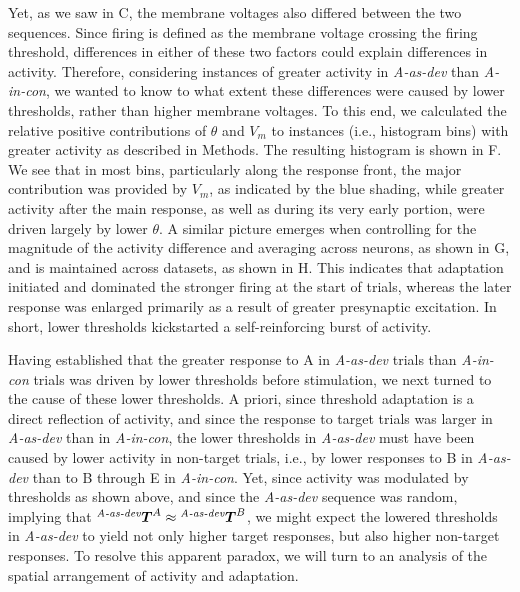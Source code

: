 \documentclass[9pt,lineno,onehalfspacing]{elife}
\newcommand{\dev}{\textit{A-as-dev}}
\newcommand{\msc}{\textit{A-in-con}}
\newcommand{\std}{\textit{A-as-std}}
\newcommand{\ifstringequal}[4]{%
  \ifnum\pdfstrcmp{#1}{#2}=0
  #3%
  \else
  #4%
  \fi
}
\newcommand{\seqreplace}[1]{\ifstringequal{dev}{#1}{\dev}{%
    \ifstringequal{std}{#1}{\std}{%
        \ifstringequal{msc}{#1}{\msc}{#1}%
    }%
}}
\newcommand{\T}[3][]{{}^{\seqreplace{#1}}_{}\boldsymbol T^{#2}_{#3}}
\begin{document}
Yet, as we saw in C, the membrane voltages also differed between the two sequences. Since firing is defined as the membrane voltage crossing the firing threshold, differences in either of these two factors could explain differences in activity. Therefore, considering instances of greater activity in \dev{} than \msc{}, we wanted to know to what extent these differences were caused by lower thresholds, rather than higher membrane voltages. To this end, we calculated the relative positive contributions of $\theta$ and $V_m$ to instances (i.e., histogram bins) with greater activity as described in Methods. The resulting histogram is shown in F. We see that in most bins, particularly along the response front, the major contribution was provided by $V_m$, as indicated by the blue shading, while greater activity after the main response, as well as during its very early portion, were driven largely by lower $\theta$.
A similar picture emerges when controlling for the magnitude of the activity difference and averaging across neurons, as shown in G, and is maintained across datasets, as shown in H. This indicates that adaptation initiated and dominated the stronger firing at the start of trials, whereas the later response was enlarged primarily as a result of greater presynaptic excitation. In short, lower thresholds kickstarted a self-reinforcing burst of activity.

Having established that the greater response to A in \dev{} trials than \msc{} trials was driven by lower thresholds before stimulation, we next turned to the cause of these lower thresholds. A priori, since threshold adaptation is a direct reflection of activity, and since the response to target trials was larger in \dev{} than in \msc{}, the lower thresholds in \dev{} must have been caused by lower activity in non-target trials, i.e., by lower responses to B in \dev{} than to B through E in \msc{}. Yet, since activity was modulated by thresholds as shown above, and since the \dev{} sequence was random, implying that $\T[dev]{A}{} \approx \T[dev]{B}{}$, we might expect the lowered thresholds in \dev{} to yield not only higher target responses, but also higher non-target responses. To resolve this apparent paradox, we will turn to an analysis of the spatial arrangement of activity and adaptation.
\end{document}
